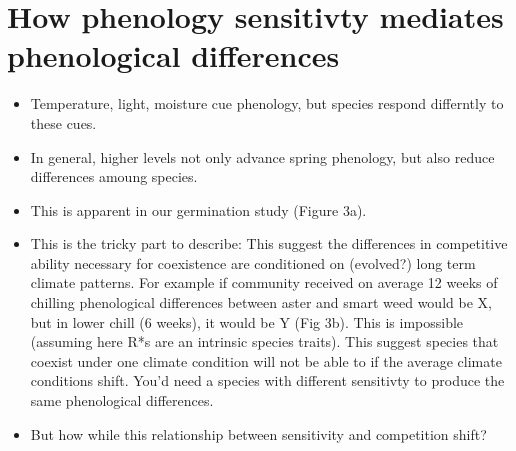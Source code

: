 \documentclass{article}[12pt]
\begin{document}
\section*{How phenology sensitivty mediates phenological differences}
\begin{itemize}
\item Temperature, light, moisture cue phenology, but species respond differntly to these cues. 
\item In general, higher levels not only advance spring phenology, but also reduce differences amoung species.
\item This is apparent in our germination study (Figure 3a). 
\item This is the tricky part to describe: This suggest the differences in competitive ability necessary for coexistence are conditioned on (evolved?) long term climate patterns. For example if community received on average 12 weeks of chilling phenological differences between aster and smart weed would be X, but in lower chill (6 weeks), it would be Y (Fig 3b). This is impossible (assuming here R*s are an intrinsic species traits). This suggest species that coexist under one climate condition will not be able to if the average climate conditions shift. You'd need a species with different sensitivty to produce the same phenological differences.
\item But how while this relationship between sensitivity and competition shift?
\end{itemize}
\end{document}
